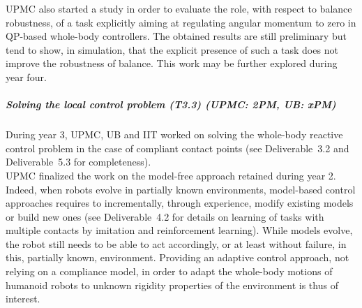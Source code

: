 UPMC also started a study in order to evaluate the role, with respect to balance robustness, of a task explicitly aiming at regulating angular momentum to zero in QP-based whole-body controllers. The obtained results are still preliminary but  tend to show, in simulation, that the explicit presence of such a task does not improve the robustness of balance. This work may be further explored during year four.

\subparagraph{Solving the local control problem (T3.3) (UPMC: 2PM, UB: xPM)}

During year 3, UPMC, UB and IIT worked on solving the whole-body reactive control problem in the case of compliant contact points (see Deliverable~3.2 \cite{deliverable32} and Deliverable~5.3 \cite{deliverable53} for completeness).\\

UPMC finalized the work on the model-free approach retained during year 2. Indeed, when robots evolve in partially known environments, model-based control approaches requires to incrementally, through experience, modify existing models or build new ones (see Deliverable~4.2 \cite{deliverable42} for details on learning of tasks with multiple contacts by imitation and reinforcement learning). While models evolve, the robot still needs to be able to act accordingly, or at least without failure, in this, partially known, environment. Providing an adaptive control approach, not relying on a compliance model, in order to adapt the whole-body motions of humanoid robots to unknown rigidity properties of the environment is thus of interest.

